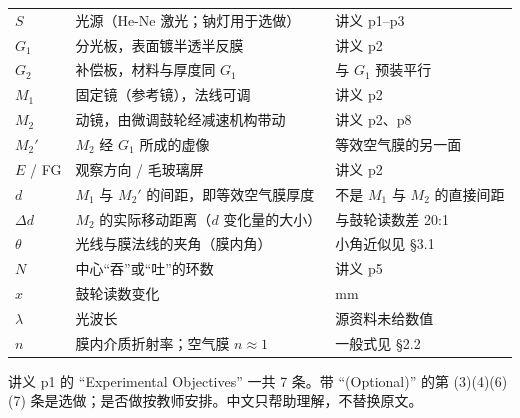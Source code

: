 \documentclass[11pt]{ctexart}
\begin{document}
\begin{center}
\small
\begin{tabular}{@{}L{1.7cm}L{9.0cm}L{3.0cm}@{}}
\toprule
{} &  & \\
\midrule
\(S\) & 光源（He-Ne 激光；钠灯用于选做） & 讲义 p1--p3\\
\(G_1\) & 分光板，表面镀半透半反膜 & 讲义 p2\\
\(G_2\) & 补偿板，材料与厚度同 \(G_1\) & 与 \(G_1\) 预装平行\\
\(M_1\) & 固定镜（参考镜），法线可调 & 讲义 p2\\
\(M_2\) & 动镜，由微调鼓轮经减速机构带动 & 讲义 p2、p8\\
\(M_2'\) & \(M_2\) 经 \(G_1\) 所成的虚像 & 等效空气膜的另一面\\
\(E\) / FG & 观察方向 / 毛玻璃屏 & 讲义 p2\\
\(d\) & \(M_1\) 与 \(M_2'\) 的间距，即等效空气膜厚度 & 不是 \(M_1\) 与 \(M_2\) 的直接间距\\
\(\Delta d\) & \(M_2\) 的实际移动距离（\(d\) 变化量的大小） & 与鼓轮读数差 20:1\\
\(\theta\) & 光线与膜法线的夹角（膜内角） & 小角近似见 §3.1\\
\(N\) & 中心“吞”或“吐”的环数 & 讲义 p5\\
\(x\) & 鼓轮读数变化 & mm\\
\(\lambda\) & 光波长 & 源资料未给数值\\
\(n\) & 膜内介质折射率；空气膜 \(n\approx1\) & 一般式见 §2.2\\
\bottomrule
\end{tabular}
\end{center}



讲义 p1 的 “Experimental Objectives” 一共 7 条。带 “(Optional)” 的第 (3)(4)(6)(7) 条是选做；是否做按教师安排。中文只帮助理解，不替换原文。
\end{document}
